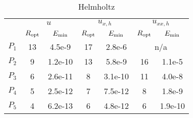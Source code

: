 \documentclass[final,3p]{elsarticle}
\begin{document}
\begin{table}[!ht]
\centering
\begin{subtable}{0.5\textwidth}
\centering
\begin{tabular}{|c|c|c|c|c|c|c|} \hline  
{} & \multicolumn{2}{c|}{$u$} & \multicolumn{2}{c|}{$u_{x,h}$} & \multicolumn{2}{c|}{$u_{xx,h}$}  \\
\cline{2-7}
 & $R_{\rm opt}$ & $E_{\rm min}$ & $R_{\rm opt}$ & $E_{\rm min}$ & $R_{\rm opt}$ & $E_{\rm min}$ \\		%
\hline
$P_1$ & 13 & 4.5e-9 & 17 & 2.8e-6 & \multicolumn{2}{c|}{n/a} \\		%
\hline
$P_2$ & 9 & 1.2e-10 & 13 & 5.8e-9 & 16 & 1.1e-5 \\		%
\hline
$P_3$ & 6 & 2.6e-11 & 8 & 3.1e-10 & 11 & 4.0e-8 \\
\hline
$P_4$ & 5 & 2.5e-12 & 7 & 7.5e-12 & 8 & 1.8e-9 \\	%
\hline
$P_5$ & 4 & 6.2e-13 & 6 & 4.8e-12 & 6 & 1.9e-10 \\	%
\hline
\end{tabular}
\caption[sss]{Helmholtz}
\end{subtable}
\end{table}
\end{document}
